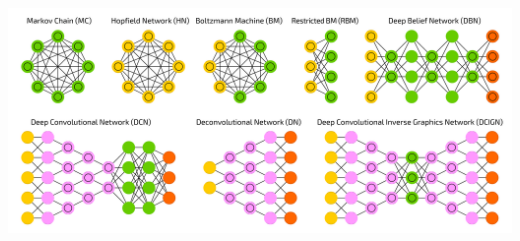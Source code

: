 \documentclass[12pt, aspectratio = 169]{beamer}
\begin{document}
\begin{frame}[c]
\begin{columns}
		\vspace{2em}
		\includegraphics[width=1\linewidth]{networkZooPoster_2}
	\end{columns}
\end{frame}

\end{document}
